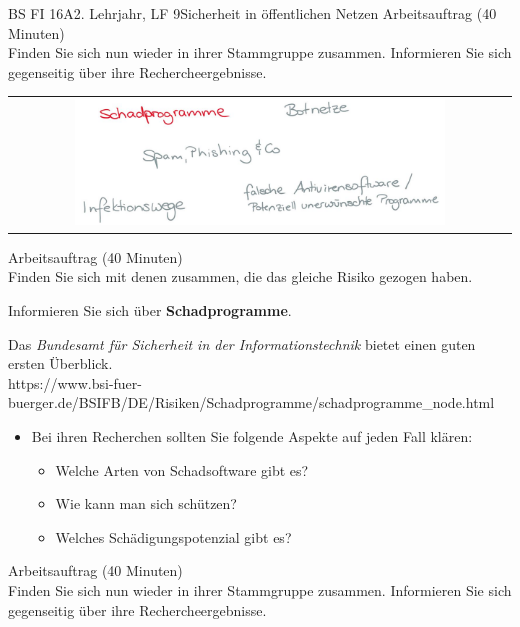 \documentclass[oneside,openany,headings=optiontotoc,11pt,numbers=noenddot]{scrreprt}
\begin{document}
\begin{worksheet}{BS FI 16A}{2. Lehrjahr, LF 9}{Sicherheit in öffentlichen Netzen}
		\color{codegray}Arbeitsauftrag (40 Minuten)\\
		\color{black}
		Finden Sie sich nun wieder in ihrer Stammgruppe zusammen. Informieren Sie sich gegenseitig über ihre Rechercheergebnisse.
	
		\newpage
		\setcounter{page}{1}
		\begin{framed}
			\begin{tabular}{lcr}
				& \includegraphics[width=0.8\textwidth]{Bilder/Schadprogramme.jpg} & \\
			\end{tabular}
		\end{framed}
		\color{codegray}Arbeitsauftrag (40 Minuten)\\
		\color{black}
		Finden Sie sich mit denen zusammen, die das gleiche Risiko gezogen haben.
		\par
		\bigskip
		\noindent
		Informieren Sie sich über \textbf{Schadprogramme}.
		\par\bigskip\noindent
		Das \textit{Bundesamt für Sicherheit in der Informationstechnik} bietet einen guten ersten Überblick.\\
		\small{\color{codegray}https://www.bsi-fuer-buerger.de/BSIFB/DE/Risiken/Schadprogramme/schadprogramme\_node.html}
		\normalsize
		\begin{itemize}
			\item[] Bei ihren Recherchen sollten Sie folgende Aspekte auf jeden Fall klären:
			\begin{itemize}
				\item Welche Arten von Schadsoftware gibt es?
				\item Wie kann man sich schützen?
				\item Welches Schädigungspotenzial gibt es?
			\end{itemize}
		\end{itemize}
		\par
		\bigskip
		\noindent
		
		\color{codegray}Arbeitsauftrag (40 Minuten)\\
		\color{black}
		Finden Sie sich nun wieder in ihrer Stammgruppe zusammen. Informieren Sie sich gegenseitig über ihre Rechercheergebnisse.
	

\end{worksheet}
\end{document}
